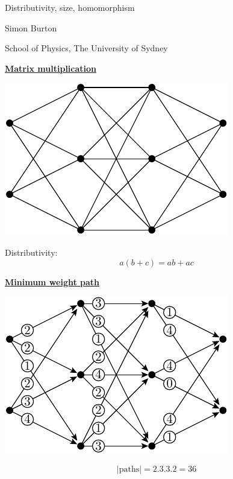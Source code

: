 \documentclass[11pt]{article}
\def\heading #1{\centerline{\underline{\bf\LARGE #1}}}
\def\vsp {\vskip 0.5cm}
\begin{document}
\large




\centerline{\LARGE }
\vskip 0.5cm
\centerline{\LARGE Distributivity, size, homomorphism}
\vskip 0.5cm
\centerline{\LARGE }

\vskip 1cm

\centerline{\Large Simon Burton}

\vskip 0.5cm

\centerline{School of Physics, The University of Sydney}


%
%
%

\newpage %

\heading{Matrix multiplication}

\centerline{\includegraphics[]{pic-trellis.pdf}}

Distributivity:
$$
    a(b + c) = ab + ac
$$
\vsp\vsp
\vsp\vsp

\newpage %

\heading{Minimum weight path}
\centerline{\includegraphics[]{pic-minpath-0.pdf}}
$$
    |\mbox{paths}| = 2.3.3.2 = 36
$$
\end{document}
